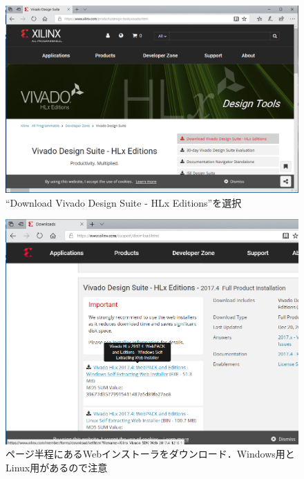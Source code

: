 \documentclass[a4paper,dvipdfmx]{jsarticle}
\begin{document}
 \begin{figure}[H]
  \begin{center}
   \includegraphics[width=.9\textwidth]{appendix_figures/02_xilinx_web_page.png}
  \end{center}
  \caption{``Download Vivado Design Suite - HLx Editions''を選択}
 \end{figure}

 \begin{figure}[H]
  \begin{center}
   \includegraphics[width=.8\textwidth]{appendix_figures/03_xilinx_web_page.png}
  \end{center}
  \caption{ページ半程にあるWebインストーラをダウンロード．Windows用とLinux用があるので注意}
 \end{figure}
\end{document}
